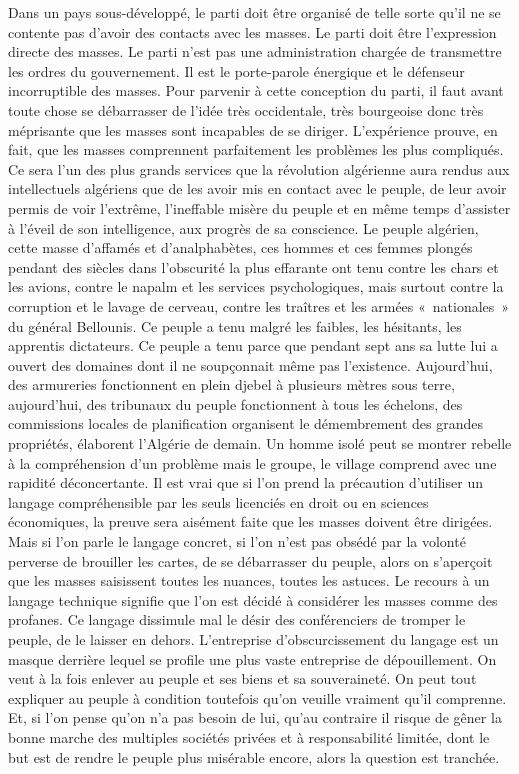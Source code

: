 \documentclass[french,twoside]{book} %
\begin{document}
Dans un pays sous-développé, le parti doit être organisé de telle sorte qu’il ne se contente pas d’avoir des contacts avec les masses. Le parti doit être l’expression directe des masses. Le parti n’est pas une administration chargée de transmettre les ordres du gouvernement. Il est le porte-parole énergique et le défenseur incorruptible des masses. Pour parvenir à cette conception du parti, il faut avant toute chose se débarrasser de l’idée très occidentale, très bourgeoise donc très méprisante que les masses sont incapables de se diriger. L’expérience prouve, en fait, que les masses comprennent parfaitement les problèmes les plus compliqués. Ce sera l’un des plus grands services que la révolution algérienne aura rendus aux intellectuels algériens que de les avoir mis en contact avec le peuple, de leur avoir permis de voir l’extrême, l’ineffable misère du peuple et en même temps d’assister à l’éveil de son intelligence, aux progrès de sa conscience. Le peuple algérien, cette masse d’affamés et d’analphabètes, ces hommes et ces femmes plongés pendant des siècles dans l’obscurité la plus effarante ont tenu contre les chars et les avions, contre le napalm et les services psychologiques, mais surtout contre la corruption et le lavage de cerveau, contre les traîtres et les armées « nationales » du général Bellounis. Ce peuple a tenu malgré les faibles, les hésitants, les apprentis dictateurs. Ce peuple a tenu parce que pendant sept ans sa lutte lui a ouvert des domaines dont il ne soupçonnait même pas l’existence. Aujourd’hui, des armureries fonctionnent en plein djebel à plusieurs mètres sous terre, aujourd’hui, des tribunaux du peuple fonctionnent à tous les échelons, des commissions locales de planification organisent le démembrement des grandes propriétés, élaborent l’Algérie de demain. Un homme isolé peut se montrer rebelle à la compréhension d’un problème mais le groupe, le village comprend avec une rapidité   déconcertante. Il est vrai que si l’on prend la précaution d’utiliser un langage compréhensible par les seuls licenciés en droit ou en sciences économiques, la preuve sera aisément faite que les masses doivent être dirigées. Mais si l’on parle le langage concret, si l’on n’est pas obsédé par la volonté perverse de brouiller les cartes, de se débarrasser du peuple, alors on s’aperçoit que les masses saisissent toutes les nuances, toutes les astuces. Le recours à un langage technique signifie que l’on est décidé à considérer les masses comme des profanes. Ce langage dissimule mal le désir des conférenciers de tromper le peuple, de le laisser en dehors. L’entreprise d’obscurcissement du langage est un masque derrière lequel se profile une plus vaste entreprise de dépouillement. On veut à la fois enlever au peuple et ses biens et sa souveraineté. On peut tout expliquer au peuple à condition toutefois qu’on veuille vraiment qu’il comprenne. Et, si l’on pense qu’on n’a pas besoin de lui, qu’au contraire il risque de gêner la bonne marche des multiples sociétés privées et à responsabilité limitée, dont le but est de rendre le peuple plus misérable encore, alors la question est tranchée.\par
\end{document}
